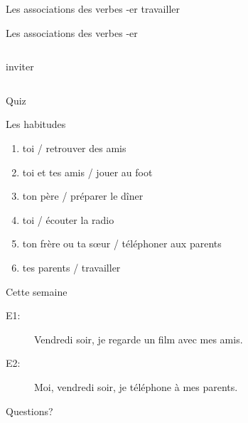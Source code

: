 \documentclass{beamer}
\begin{document}
  \begin{frame}{Les associations des verbes -er}
    \centering
    travailler

  \end{frame}

  \begin{frame}{Les associations des verbes -er}
    \begin{columns}
        \begin{center}
          inviter
        \end{center}
        \begin{center}
        \end{center}
    \end{columns}
  \end{frame}

  \begin{frame}{}
    \begin{center}
      \Large Quiz
    \end{center}
  \end{frame}

  \begin{frame}{Les habitudes}
    \begin{enumerate}
      \item toi / retrouver des amis
      \item toi et tes amis / jouer au foot
      \item ton père / préparer le dîner
      \item toi / écouter la radio
      \item ton frère ou ta sœur / téléphoner aux parents
      \item tes parents / travailler
    \end{enumerate}
  \end{frame}

  \begin{frame}{Cette semaine}
    \begin{description}
      \item[E1:] Vendredi soir, je regarde un film avec mes amis.
      \item[E2:] Moi, vendredi soir, je téléphone à mes parents.
    \end{description}

  \end{frame}

  \begin{frame}{}
    \begin{center}
      \Large Questions?
    \end{center}
  \end{frame}
\end{document}
